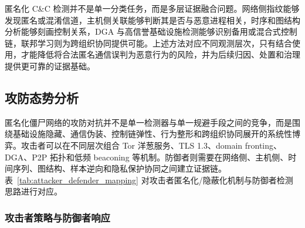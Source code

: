 匿名化 C\&C 检测并不是单一分类任务，而是多层证据融合问题。网络侧指纹能够发现匿名或混淆信道，主机侧关联能够判断其是否与恶意进程相关，时序和图结构分析能够刻画控制关系，DGA 与高信誉基础设施检测能够识别备用或混合式控制链，联邦学习则为跨组织协同提供可能。上述方法对应不同观测层次，只有结合使用，才能降低将合法匿名通信误判为恶意行为的风险，并为后续归因、处置和治理提供更可靠的证据基础。

\subsection{攻防态势分析}

匿名化僵尸网络的攻防对抗并不是单一检测器与单一规避手段之间的竞争，而是围绕基础设施隐藏、通信伪装、控制链弹性、行为整形和跨组织协同展开的系统性博弈。攻击者可以在不同层次组合 Tor 洋葱服务、TLS 1.3、domain fronting、DGA、P2P 拓扑和低频 beaconing 等机制。防御者则需要在网络侧、主机侧、时间序列、图结构、样本逆向和隐私保护协同之间建立证据链。表~\ref{tab:attacker_defender_mapping} 对攻击者匿名化/隐蔽化机制与防御者检测思路进行对应。

\subsubsection{攻击者策略与防御者响应}
\label{subsec:comparison}

